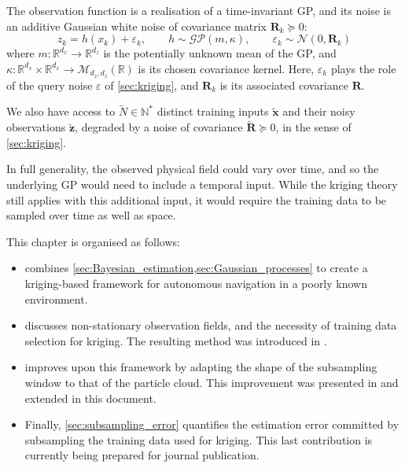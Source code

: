 \begin{assumption}\label{th:kriging_navigation_assumptions}
	The observation function is a realisation of a time-invariant GP, and its noise is an additive Gaussian white noise of covariance matrix $\mathbf{R}_k\succeq0$:
	\begin{equation}
		z_k=h(x_k)+\varepsilon_k,\qquad h\sim\mathcal{GP}(m,\kappa),\qquad \varepsilon_k\sim\mathcal{N}(0,\mathbf{R}_k)
	\end{equation}
	where $m:\mathbb{R}^{d_x}\to\mathbb{R}^{d_z}$ is the potentially unknown mean of the GP, and $\kappa:\mathbb{R}^{d_x}\times\mathbb{R}^{d_x}\to\mathcal{M}_{d_z,d_z}(\mathbb{R})$ is its chosen covariance kernel. Here, $\varepsilon_k$ plays the role of the query noise $\varepsilon$ of \cref{sec:kriging}, and $\mathbf{R}_k$ is its associated covariance $\mathbf{R}$.

	We also have access to $\tilde{N}\in\mathbb{N}^*$ distinct training inputs $\tilde{\mathbf{x}}$ and their noisy observations $\tilde{\mathbf{z}}$, degraded by a noise of covariance $\tilde{\mathbf{R}}\succeq0$, in the sense of \cref{sec:kriging}.
\end{assumption}

\begin{remark}
	In full generality, the observed physical field could vary over time, and so the underlying GP would need to include a temporal input. While the kriging theory still applies with this additional input, it would require the training data to be sampled over time as well as space.
\end{remark}

This chapter is organised as follows:
\begin{itemize}
	\item{} combines \cref{sec:Bayesian_estimation,sec:Gaussian_processes} to create a kriging-based framework for autonomous navigation in a poorly known environment.
	\item{} discusses non-stationary observation fields, and the necessity of training data selection for kriging. The resulting method was introduced in \cite{bib:AK-PF}.
	\item{} improves upon this framework by adapting the shape of the subsampling window to that of the particle cloud. This improvement was presented in \cite{bib:AK-PF-clustered} and extended in this document.
	\item Finally, \cref{sec:subsampling_error} quantifies the estimation error committed by subsampling the training data used for kriging. This last contribution is currently being prepared for journal publication.
\end{itemize}

